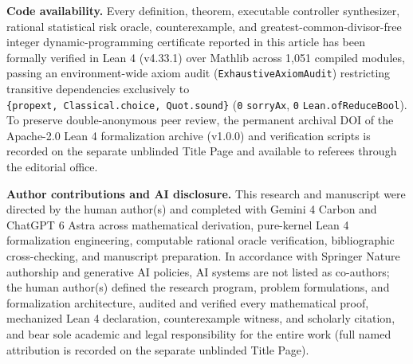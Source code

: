 \documentclass[11pt,a4paper]{article}
\begin{document}
\textbf{Code availability.} Every definition, theorem, executable
controller synthesizer, rational statistical risk oracle,
counterexample, and greatest-common-divisor-free integer
dynamic-programming certificate reported in this article has been
formally verified in Lean 4 (v4.33.1) over Mathlib across 1,051 compiled
modules, passing an environment-wide axiom audit
(\texttt{ExhaustiveAxiomAudit}) restricting transitive dependencies
exclusively to \texttt{\{propext,\ Classical.choice,\ Quot.sound\}}
(\texttt{0} \texttt{sorryAx}, \texttt{0} \texttt{Lean.ofReduceBool}). To
preserve double-anonymous peer review, the permanent archival DOI of the
Apache-2.0 Lean 4 formalization archive (v1.0.0) and verification
scripts is recorded on the separate unblinded Title Page and available
to referees through the editorial office.

\textbf{Author contributions and AI disclosure.} This research and
manuscript were directed by the human author(s) and completed with
Gemini 4 Carbon and ChatGPT 6 Astra across mathematical derivation,
pure-kernel Lean 4 formalization engineering, computable rational oracle
verification, bibliographic cross-checking, and manuscript preparation.
In accordance with Springer Nature authorship and generative AI
policies, AI systems are not listed as co-authors; the human author(s)
defined the research program, problem formulations, and formalization
architecture, audited and verified every mathematical proof, mechanized
Lean 4 declaration, counterexample witness, and scholarly citation, and
bear sole academic and legal responsibility for the entire work (full
named attribution is recorded on the separate unblinded Title Page).

\clearpage
\begingroup
\nolinenumbers
{}
\small
\setlength{\bibsep}{5.0pt}


\endgroup
\end{document}
